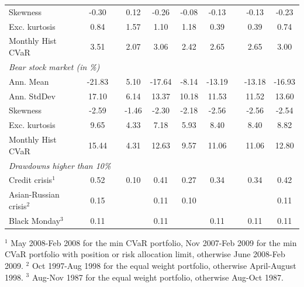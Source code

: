 \documentclass[12pt,a4paper]{article}
\begin{document}
\begin{table}[tb]
\begin{center}
{\begin{tabular}{|lc c c cccc c cc | }
  \multicolumn{2}{|l}{Skewness }       &      -0.30 & &0.12 & -0.26 & -0.08 & -0.13 & &-0.13 & -0.23   \\
    \multicolumn{2}{|l}{Exc. kurtosis }   &     0.84 & &1.57 & 1.10 & 1.18 & 0.39 & &0.39 & 0.74   \\
 \multicolumn{2}{|l}{Monthly Hist  CVaR}   &    3.51 & &2.07 & 3.06 & 2.42 & 2.65 & &2.65 & 3.00 \\ \hline
 \multicolumn{11}{|l|}{\emph{Bear stock market (in \%)}} \\
 \multicolumn{2}{|l}{Ann. Mean  }    &      -21.83 & & 5.10 & -17.64 & -8.14 & -13.19 & & -13.18 & -16.93 \\
 \multicolumn{2}{|l}{Ann. StdDev}     &      17.10 & &6.14 & 13.37 & 10.18 & 11.53 & &11.52 & 13.60   \\
  \multicolumn{2}{|l}{Skewness}     &         -2.59 & &-1.46 & -2.30 & -2.18 & -2.56 && -2.56 & -2.54   \\
    \multicolumn{2}{|l}{Exc. kurtosis}   &      9.65 & &4.33 & 7.18 & 5.93 & 8.40 & &8.40 & 8.82     \\
 \multicolumn{2}{|l}{Monthly Hist  CVaR}   &	 15.44 && 4.31 & 12.63 & 9.57 & 11.06 & &11.06 & 12.80 \\\hline
\multicolumn{11}{|l|}{ \emph{Drawdowns higher than 10\%}  }  \\
 \multicolumn{2}{|l}{Credit crisis$^{1}$}       &  0.52 & & 0.10 & 0.41 & 0.27 & 0.34 & & 0.34 & 0.42    \\
 \multicolumn{2}{|l}{Asian-Russian crisis$^{2}$}& 0.15    & &  &  0.11    & 0.10 &      & &      & 0.11   \\
 \multicolumn{2}{|l}{ Black Monday$^{3}$}	& 0.11 &  & &   0.11 &      & 0.11 & & 0.11 & 0.11 \\
 \hline
\end{tabular}
}
\end{center}


{\scriptsize $^{1}$ May 2008-Feb 2008 for the min CVaR portfolio, Nov 2007-Feb 2009 for the min CVaR portfolio with position or risk allocation limit, otherwise June 2008-Feb 2009.  $^{2}$ Oct 1997-Aug 1998 for the equal weight portfolio, otherwise April-August 1998. $^{3}$ Aug-Nov 1987 for the equal weight portfolio, otherwise Aug-Oct 1987. }
\end{table}
\end{document}
